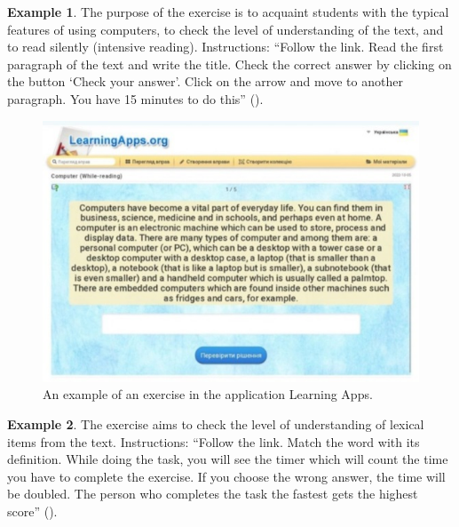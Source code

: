 \textbf{Example 1}. The purpose of the exercise is to acquaint students with the
typical features of using computers, to check the level of understanding
of the text, and to read silently (intensive reading). Instructions:
\enquote{Follow the link. Read the first paragraph of the text and write the
title. Check the correct answer by clicking on the button \enquote{Check
your answer}. Click on the arrow and move to another paragraph. You
have 15 minutes to do this} ().

\begin{figure}[htpb]
\centering
\begin{minipage}{.65\textwidth}
\caption{An example of an exercise in the application Learning Apps.}	
\label{fig-03}
\includegraphics[width=\textwidth]{figure03}
\end{minipage}
\end{figure}

\textbf{Example 2}. The exercise aims to check the level of understanding of
lexical items from the text. Instructions: \enquote{Follow the link. Match the
word with its definition. While doing the task, you will see the timer
which will count the time you have to complete the exercise. If you
choose the wrong answer, the time will be doubled. The person who
completes the task the fastest gets the highest score} ().

